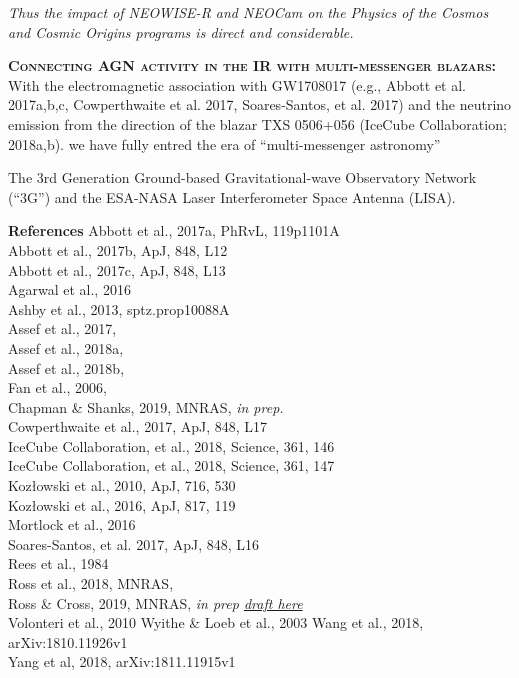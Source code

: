 \documentclass[12pt]{article}
\begin{document}
\smallskip
\smallskip
\noindent
{\it Thus the impact of NEOWISE-R and NEOCam on the Physics of the Cosmos and 
Cosmic Origins programs is direct and considerable.}

\smallskip
\smallskip
\noindent
\textbf{\textsc{Connecting AGN activity in the IR with multi-messenger blazars: }}
With the electromagnetic association with GW1708017 (e.g., Abbott et
al. 2017a,b,c, Cowperthwaite et al. 2017, Soares-Santos, et
al. 2017)
and the neutrino emission from the direction of the blazar TXS 0506+056 
(IceCube Collaboration; 2018a,b).
we have  fully entred the era of ``multi-messenger astronomy'' 

The 3rd Generation Ground-based Gravitational-wave Observatory Network
(``3G'') and the ESA-NASA Laser Interferometer Space Antenna (LISA). 

\smallskip
\smallskip
\noindent





\pagebreak
\textbf{References}
Abbott et al., 2017a,  PhRvL, 119p1101A	\\
Abbott et al., 2017b, ApJ, 848, L12	\\
Abbott et al., 2017c, ApJ, 848, L13	\\
Agarwal et al., 2016 \\
Ashby et al., 2013, sptz.prop10088A \\
Assef et al., 2017, \\
Assef et al., 2018a, \\
Assef et al., 2018b, \\
Fan  et al., 2006, \\
Chapman \& Shanks, 2019, MNRAS, {\it in prep.} \\
Cowperthwaite et al., 2017,  ApJ, 848, L17	\\
IceCube Collaboration, et al., 2018, Science, 361, 146 \\ 
IceCube Collaboration, et al., 2018, Science, 361, 147 \\
Koz{\l}owski et al., 2010, ApJ, 716, 530 \\  
Koz{\l}owski et al., 2016, ApJ, 817, 119 \\
Mortlock  et al., 2016 \\
Soares-Santos, et al. 2017, ApJ, 848, L16	\\
Rees  et al., 1984 \\
Ross et al., 2018, MNRAS, \\
Ross \& Cross, 2019, MNRAS, {\it in prep \href{https://github.com/d80b2t/VHzQ}{draft here}} \\
Volonteri  et al., 2010
Wyithe \& Loeb et al., 2003
Wang et al., 2018,  arXiv:1810.11926v1 \\
Yang et al, 2018, arXiv:1811.11915v1 \\
\end{document}
